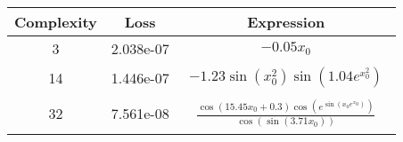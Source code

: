 \begin{center}
        \begin{tabular}{|c|c|c|}
        \hline
        Complexity & Loss & Expression \\
        \hline
        3 & 2.038e-07 & $\begin{aligned}- 0.05 x_{0}\end{aligned}$\\ \hline14 & 1.446e-07 & $\begin{aligned}- 1.23 \sin{\left(x_{0}^{2} \right)} \sin{\left(1.04 e^{x_{0}^{2}} \right)}\end{aligned}$\\ \hline32 & 7.561e-08 & $\begin{aligned}\frac{\cos{\left(15.45 x_{0} + 0.3 \right)} \cos{\left(e^{\sin{\left(x_{0} e^{x_{0}} \right)}} \right)}}{\cos{\left(\sin{\left(3.71 x_{0} \right)} \right)}}\end{aligned}$\\ \hline\end{tabular}
        \end{center}
        